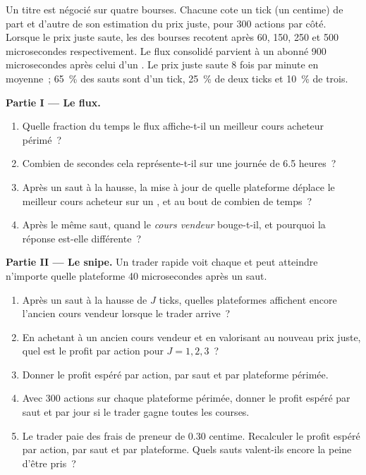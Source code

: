 \begin{problem}\label{pb:m1:us-equity-market-structure:1}
Un titre est négocié sur quatre bourses. Chacune cote un tick (un centime) de part et d'autre
de son estimation du prix juste, pour 300 actions par côté. Lorsque le prix juste saute, les
 des bourses recotent après 60, 150, 250 et 500
microsecondes respectivement. Le flux consolidé parvient à un abonné 900 microsecondes
après celui d'un . Le prix juste saute 8 fois par minute en moyenne~;
65~\% des sauts sont d'un tick, 25~\% de deux ticks et 10~\% de trois.

\medskip\noindent\textbf{Partie I --- Le flux.}
\begin{enumerate}
\item Quelle fraction du temps le flux affiche-t-il un meilleur cours acheteur périmé~?
\item Combien de secondes cela représente-t-il sur une journée de 6.5 heures~?
\item Après un saut à la hausse, la mise à jour de quelle plateforme déplace le meilleur cours acheteur
sur un , et au bout de combien de temps~?
\item Après le même saut, quand le \emph{cours vendeur} bouge-t-il, et pourquoi
la réponse est-elle différente~?
\end{enumerate}

\medskip\noindent\textbf{Partie II --- Le snipe.}
Un trader rapide voit chaque  et peut atteindre n'importe quelle plateforme
40 microsecondes après un saut.
\begin{enumerate}[resume]
\item Après un saut à la hausse de $J$ ticks, quelles plateformes affichent encore
l'ancien cours vendeur lorsque le trader arrive~?
\item En achetant à un ancien cours vendeur et en valorisant au nouveau prix juste, quel
est le profit par action pour $J = 1, 2, 3$~?
\item Donner le profit espéré par action, par saut et par plateforme périmée.
\item Avec 300 actions sur chaque plateforme périmée, donner le profit espéré par saut
et par jour si le trader gagne toutes les courses.
\item Le trader paie des frais de preneur de 0.30 centime. Recalculer le profit espéré
par action, par saut et par plateforme. Quels sauts valent-ils encore la peine d'être pris~?
\end{enumerate}


\end{problem}
